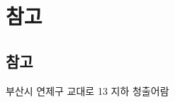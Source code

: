 \documentclass[12pt, a4paper, oneside]{book}
\let\stdsection\section
\renewcommand\section{\newpage\stdsection}
\begin{document}
	\chapter{참고}
	\minitoc				%
	

	\section{참고}


		부산시 연제구 교대로 13 지하  청출어람




\end{document}
